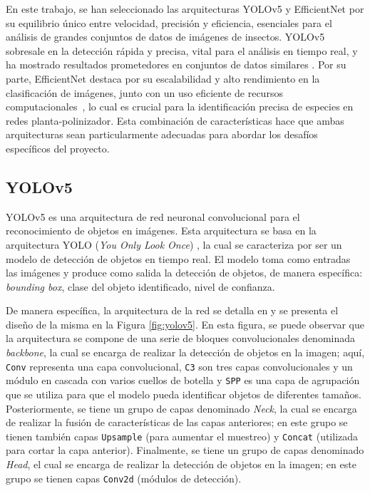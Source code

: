 En este trabajo, se han seleccionado las arquitecturas YOLOv5 y EfficientNet por su equilibrio único entre velocidad, precisión y eficiencia, esenciales para el análisis de grandes conjuntos de datos de imágenes de insectos. YOLOv5 sobresale en la detección rápida y precisa, vital para el análisis en tiempo real, y ha mostrado resultados prometedores en conjuntos de datos similares \cite{ahmad-2022}. Por su parte, EfficientNet destaca por su escalabilidad y alto rendimiento en la clasificación de imágenes, junto con un uso eficiente de recursos computacionales~\cite{bjerge-2023}, lo cual es crucial para la identificación precisa de especies en redes planta-polinizador. Esta combinación de características hace que ambas arquitecturas sean particularmente adecuadas para abordar los desafíos específicos del proyecto.

\subsection{YOLOv5}

YOLOv5 es una arquitectura de red neuronal convolucional para el reconocimiento de objetos en imágenes. Esta arquitectura se basa en la arquitectura YOLO (\textit{You Only Look Once}) \cite{redmon-2015}, la cual se caracteriza por ser un modelo de detección de objetos en tiempo real. El modelo toma como entradas las imágenes y produce como salida la detección de objetos, de manera específica: \textit{bounding box}, clase del objeto identificado, nivel de confianza.

De manera específica, la arquitectura de la red se detalla en \cite{nepal-2022} y se presenta el diseño de la misma en la Figura \ref{fig:yolov5}. En esta figura, se puede observar que la arquitectura se compone de una serie de bloques convolucionales denominada \textit{backbone}, la cual se encarga de realizar la detección de objetos en la imagen; aquí, \texttt{Conv} representa una capa convolucional, \texttt{C3} son tres capas convolucionales y un módulo en cascada con varios cuellos de botella y \texttt{SPP} es una capa de agrupación que se utiliza para que el modelo pueda identificar objetos de diferentes tamaños. Posteriormente, se tiene un grupo de capas denominado \textit{Neck}, la cual se encarga de realizar la fusión de características de las capas anteriores; en este grupo se tienen también capas \texttt{Upsample} (para aumentar el muestreo) y \texttt{Concat} (utilizada para cortar la capa anterior). Finalmente, se tiene un grupo de capas denominado \textit{Head}, el cual se encarga de realizar la detección de objetos en la imagen; en este grupo se tienen capas \texttt{Conv2d} (módulos de detección).

